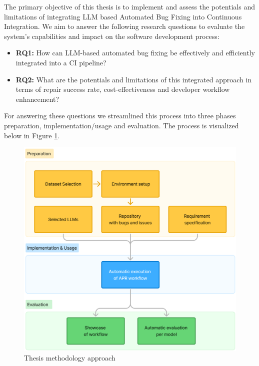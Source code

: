 The primary objective of this thesis is to implement and assess the potentials and limitations of integrating LLM based Automated Bug Fixing into Continuous Integration. We aim to answer the following research questions to evaluate the system's capabilities and impact on the software development process:

\begin{itemize}
    \item \textbf{RQ1:} How can LLM-based automated bug fixing be effectively and efficiently integrated into a CI pipeline?
    \item \textbf{RQ2:} What are the potentials and limitations of this integrated approach in terms of repair success rate, cost-effectiveness and developer workflow enhancement?
\end{itemize}

For answering these questions we streamlined this process into three phases preparation, implementation/usage and evaluation. The process is visualized below in Figure \ref{fig:method-overview}.

\begin{figure}[H]
    \centering
    \includegraphics[width=1\textwidth]{images/flowcharts/method.png}
    \caption{Thesis methodology approach}
    \label{fig:method-overview}
\end{figure}

